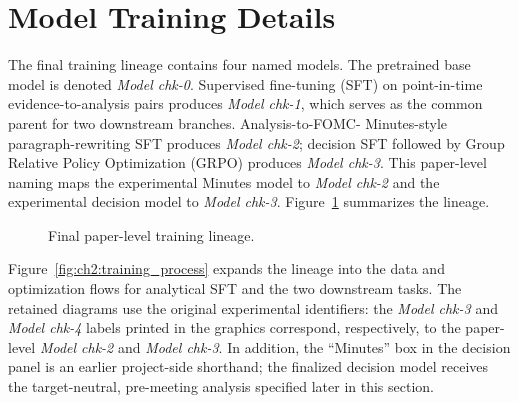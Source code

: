 \newcommand{\prompttag}[1]{\textcolor{blue}{\texttt{<|#1|>}}}

\section{Model Training Details}\label{ch2:sec:training}

The final training lineage contains four named models. The pretrained base
model is denoted \textit{Model chk-0}. Supervised fine-tuning (SFT) on
point-in-time evidence-to-analysis pairs produces \textit{Model chk-1}, which
serves as the common parent for two downstream branches. Analysis-to-FOMC-
Minutes-style paragraph-rewriting SFT produces \textit{Model chk-2}; decision
SFT followed by Group Relative
Policy Optimization (GRPO) produces \textit{Model chk-3}. This paper-level
naming maps the experimental Minutes model to \textit{Model chk-2} and the
experimental decision model to \textit{Model chk-3}. Figure~\ref{fig:ch2:training_stage1} summarizes the lineage.

\begin{figure}[htbp]
    \centering
    \caption{Final paper-level training lineage.}
    \label{fig:ch2:training_stage1}
\end{figure}

Figure~\ref{fig:ch2:training_process} expands the lineage into the data and
optimization flows for analytical SFT and the two downstream tasks. The
retained diagrams use the original experimental identifiers: the
\textit{Model chk-3} and \textit{Model chk-4} labels printed in the graphics
correspond, respectively, to the paper-level \textit{Model chk-2} and
\textit{Model chk-3}. In addition, the ``Minutes'' box in the decision panel is
an earlier project-side shorthand; the finalized decision model receives the
target-neutral, pre-meeting analysis specified later in this section.

